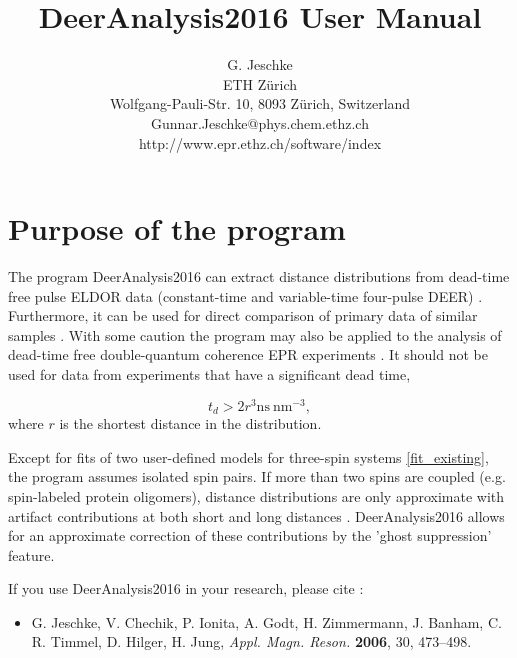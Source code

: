 \documentclass{article}
\begin{document}
\title{DeerAnalysis2016 User Manual}

\author{G. Jeschke \\ ETH Z\"urich \\ Wolfgang-Pauli-Str. 10, 8093 Z\"urich, Switzerland \\ Gunnar.Jeschke@phys.chem.ethz.ch \\ http://www.epr.ethz.ch/software/index}

\maketitle 

\section{Purpose of the program}
\label{purpose}

The program DeerAnalysis2016 can extract distance distributions from dead-time free pulse ELDOR data (constant-time and variable-time four-pulse DEER) \cite{pannier2000,jeschke2004b}. Furthermore, it can be used for direct comparison of primary data of similar samples \cite{jeschke2004a}. With some caution \cite{jeschke2001} the program may also be applied to the analysis of dead-time free double-quantum coherence EPR experiments \cite{borbat1999}. It should not be used for data from experiments that have a significant dead time,

\begin{equation}
	t_{d}> 2 r^{3} \mathrm{ns} \ \mathrm{nm}^{-3} ,
\end{equation}
where $r$ is the shortest distance in the distribution.

Except for fits of two user-defined models for three-spin systems \ref{fit_existing}, the program assumes isolated spin pairs. If more than two spins are coupled (e.g. spin-labeled protein oligomers), distance distributions are only approximate with artifact contributions at both short and long distances \cite{jeschke2009}. DeerAnalysis2016 allows for an approximate correction of these contributions by the 'ghost suppression' feature.

\vspace{10pt}

If you use DeerAnalysis2016 in your research, please cite \cite{jeschke2006}:
\begin{itemize}
	\item G. Jeschke, V. Chechik, P. Ionita, A. Godt, H. Zimmermann, J. Banham, C. R. Timmel, D. Hilger, H. Jung, \emph{Appl. Magn. Reson.} {\bf 2006}, 30, 473--498.
\end{itemize}
\end{document}
